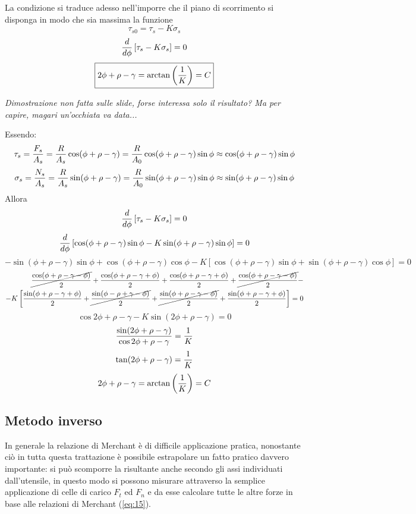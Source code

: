 \documentclass[a4paper, 15pt]{article}
\begin{document}
	La condizione si traduce adesso nell'imporre che il piano di scorrimento si disponga in modo che sia massima la funzione
	\[\tau_{s0} = \tau_s-K\sigma_s\]
	\[{d\over d\phi}\left[\tau_s-K\sigma_s\right] = 0\]
	\begin{equation}\label{eq:19}
		\boxed{2\phi+\rho-\gamma = \arctan\left(1\over K\right)=C}
	\end{equation}
	\begin{center}
		{\small \textit{Dimostrazione non fatta sulle slide, forse interessa solo il risultato? Ma per capire, magari un'occhiata va data...}}
	\end{center}
	Essendo:
	\[\tau_s = {F_s\over A_s} = {R\over A_s}\cos(\phi+\rho-\gamma) = {R\over A_0}\cos(\phi+\rho-\gamma)\sin\phi\approx\cos(\phi+\rho-\gamma)\sin\phi\]
	\[\sigma_s = {N_s\over A_s} = {R\over A_s}\sin(\phi+\rho-\gamma) = {R\over A_0}\sin(\phi+\rho-\gamma)\sin\phi\approx\sin(\phi+\rho-\gamma)\sin\phi\]
	Allora 
	\[{d\over d\phi}\left[\tau_s-K\sigma_s\right] = 0\]
	\[{d\over d\phi}\left[\cos(\phi+\rho-\gamma)\sin\phi-K\sin(\phi+\rho-\gamma)\sin\phi\right]=0\]
	\[
		-\sin(\phi+\rho-\gamma)\sin\phi + \cos(\phi+\rho-\gamma)\cos\phi - K\left[\cos(\phi+\rho-\gamma)\sin\phi + \sin(\phi+\rho-\gamma)\cos\phi\right]=0\]
	\[\begin{split}\cancel{\dfrac{\cos(\phi+\rho-\gamma-\phi)}{2}} + \dfrac{\cos(\phi+\rho-\gamma+\phi)}{2} + \dfrac{\cos(\phi+\rho-\gamma+\phi)}{2} + \cancel{\dfrac{\cos(\phi+\rho-\gamma-\phi)}{2}} - \\ -K\left[\dfrac{\sin(\phi+\rho-\gamma+\phi)}{2} + \cancel{\dfrac{\sin(\phi-\rho+\gamma-\phi)}{2}} + \cancel{\dfrac{\sin(\phi+\rho-\gamma-\phi)}{2}} + \dfrac{\sin(\phi+\rho-\gamma+\phi)}{2} \right] = 0
	\end{split}\]
	\[\cos{2\phi+\rho-\gamma} - K\sin(2\phi+\rho-\gamma) = 0\]
	\[\dfrac{\sin(2\phi+\rho-\gamma)}{\cos{2\phi+\rho-\gamma}} = {1\over K}\]
	\[\tan(2\phi+\rho-\gamma) = {1\over K}\]
	\[2\phi+\rho-\gamma = \arctan\left(1\over K\right)=C\]
	\newpage
	\subsection{Metodo inverso}
	In generale la relazione di Merchant è di difficile applicazione pratica, nonostante ciò in tutta questa trattazione è possibile estrapolare un fatto pratico davvero importante: si può scomporre la risultante anche secondo gli assi individuati dall'utensile, in questo modo si possono misurare attraverso la semplice applicazione di celle di carico $F_t$ ed $F_n$ e da esse calcolare tutte le altre forze in base alle relazioni di Merchant (\ref{eq:15}).
	
\end{document}
